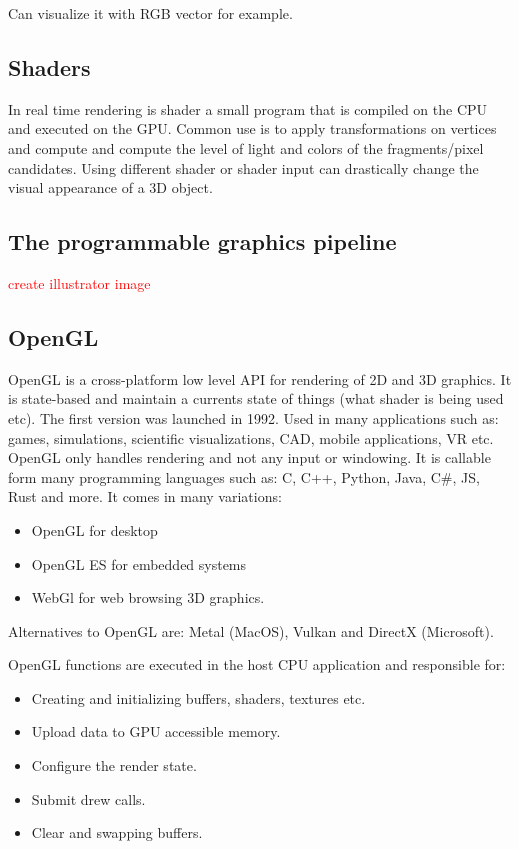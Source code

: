 Can visualize it with RGB vector for example.

\subsection*{Shaders}
In real time rendering is shader a small program that is compiled on the CPU and executed on the GPU. Common use is to apply transformations on vertices and compute and compute the level of light and colors of the fragments/pixel candidates. Using different shader or shader input can drastically change the visual appearance of a 3D object. 

\subsection*{The programmable graphics pipeline}

\textcolor{red}{create illustrator image} 

\subsection*{OpenGL}
OpenGL is a cross-platform low level API for rendering of 2D and 3D graphics. It is 
state-based and maintain a currents state of things (what shader is being used etc). The first version was launched in 1992. Used in many applications such as: games, simulations, scientific visualizations, CAD, mobile applications, VR etc.  
OpenGL only handles rendering and not any input or windowing. It is callable form many programming languages such as: C, C++, Python, Java, C\#, JS, Rust and more. It comes in many variations: 
\begin{itemize}
	\item OpenGL for desktop
	\item OpenGL ES for embedded systems
	\item WebGl for web browsing 3D graphics.
\end{itemize}
Alternatives to OpenGL are: Metal (MacOS), Vulkan and DirectX (Microsoft).

OpenGL functions are executed in the host CPU application and responsible for: 

\begin{itemize}
	\item Creating and initializing buffers, shaders, textures etc.
	\item Upload data to GPU accessible memory. 
	\item Configure the render state.
	\item Submit drew calls.
	\item Clear and swapping buffers.
\end{itemize}


